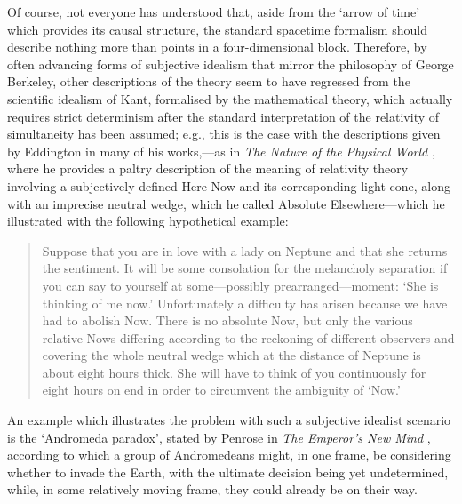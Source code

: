 Of course, not everyone has understood that, aside from the `arrow of time' which provides its causal structure, the standard spacetime formalism should describe nothing more than points in a four-dimensional block. Therefore, by often advancing forms of subjective idealism that mirror the philosophy of George Berkeley, other descriptions of the theory seem to have regressed from the scientific idealism of Kant, formalised by the mathematical theory, which actually requires strict determinism after the standard interpretation of the relativity of simultaneity has been assumed; e.g., this is the case with the descriptions given by Eddington in many of his works,---as in \textit{The Nature of the Physical World} \cite{Eddington1929}, where he provides a paltry description of the meaning of relativity theory involving a subjectively-defined Here-Now and its corresponding light-cone, along with an imprecise neutral wedge, which he called Absolute Elsewhere---which he illustrated with the following hypothetical example:
\begin{quote}
Suppose that you are in love with a lady on Neptune and that she returns the sentiment. It will be some consolation for the melancholy separation if you can say to yourself at some---possibly prearranged---moment: `She is thinking of me now.' Unfortunately a difficulty has arisen because we have had to abolish Now. There is no absolute Now, but only the various relative Nows differing according to the reckoning of different observers and covering the whole neutral wedge which at the distance of Neptune is about eight hours thick. She will have to think of you continuously for eight hours on end in order to circumvent the ambiguity of `Now.'
\end{quote}
An example which illustrates the problem with such a subjective idealist scenario is the `Andromeda paradox', stated by Penrose in \textit{The Emperor's New Mind} \cite{Penrose1989}, according to which a group of Andromedeans might, in one frame, be considering whether to invade the Earth, with the ultimate decision being yet undetermined, while, in some relatively moving frame, they could already be on their way. 


